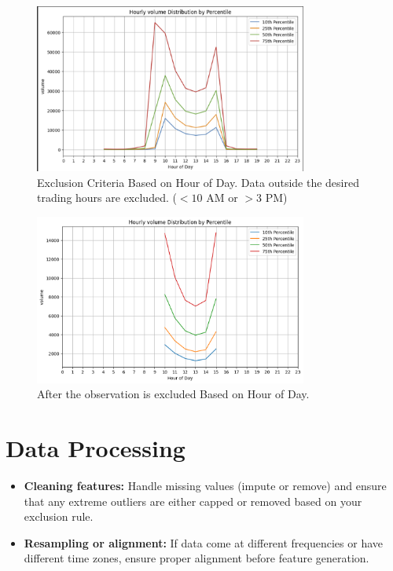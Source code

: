 \documentclass[11pt]{article}
\begin{document}
\begin{figure}[ht]
    \centering
    \includegraphics[width=0.8\textwidth]{exclusion_hour_of_day_1.png}
    \caption{Exclusion Criteria Based on Hour of Day. Data outside the desired trading hours are excluded. ($<10$ AM or $>3$ PM)}
    \label{fig:exclusion_hour}
\end{figure}

\begin{figure}[ht]
    \centering
    \includegraphics[width=0.8\textwidth]{exclusion_hour_of_day_2.png}
    \caption{After the observation is excluded Based on Hour of Day.}
    \label{fig:after_exclusion_hour}
\end{figure}

\section{Data Processing}
\begin{itemize}
    \item \textbf{Cleaning features:} Handle missing values (impute or remove) and ensure that any extreme outliers are either capped or removed based on your exclusion rule.
    \item \textbf{Resampling or alignment:} If data come at different frequencies or have different time zones, ensure proper alignment before feature generation.
\end{itemize}
\end{document}
